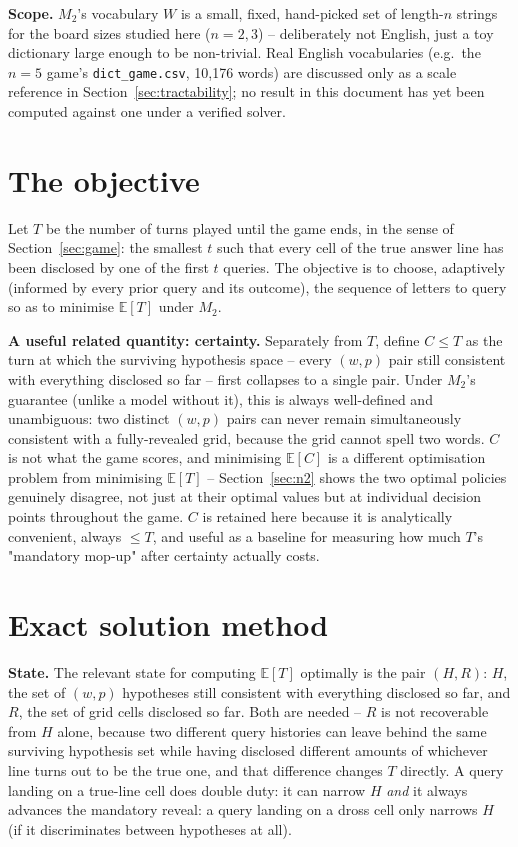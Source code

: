 \documentclass[11pt]{article}
\begin{document}
\textbf{Scope.} $M_2$'s vocabulary $W$ is a small, fixed, hand-picked set
of length-$n$ strings for the board sizes studied here ($n=2,3$) --
deliberately not English, just a toy dictionary large enough to be
non-trivial. Real English vocabularies (e.g.\ the $n=5$ game's
\texttt{dict\_game.csv}, 10,176 words)
are discussed only as a scale reference in Section~\ref{sec:tractability};
no result in this document has yet been computed against one under a
verified solver.

\section{The objective}
\label{sec:objective}

Let $T$ be the number of turns played until the game ends, in the sense
of Section~\ref{sec:game}: the smallest $t$ such that every cell of the
true answer line has been disclosed by one of the first $t$ queries. The
objective is to choose, adaptively (informed by every prior query and its
outcome), the sequence of letters to query so as to minimise
$\mathbb{E}[T]$ under $M_2$.

\textbf{A useful related quantity: certainty.} Separately from $T$,
define $C \le T$ as the turn at which the surviving hypothesis space --
every $(w,p)$ pair still consistent with everything disclosed so far --
first collapses to a single pair. Under $M_2$'s guarantee (unlike a model
without it), this is always well-defined and unambiguous: two distinct
$(w,p)$ pairs can never remain simultaneously consistent with a
fully-revealed grid, because the grid cannot spell two words. $C$ is not
what the game scores, and minimising $\mathbb{E}[C]$ is a different
optimisation problem from minimising $\mathbb{E}[T]$ -- Section~\ref{sec:n2}
shows the two optimal policies genuinely disagree, not just at their
optimal values but at individual decision points throughout the game. $C$
is retained here because it is analytically convenient, always $\le T$,
and useful as a baseline for measuring how much $T$'s "mandatory mop-up"
after certainty actually costs.

\section{Exact solution method}
\label{sec:method}

\textbf{State.} The relevant state for computing $\mathbb{E}[T]$ optimally
is the pair $(H, R)$: $H$, the set of $(w,p)$ hypotheses still consistent
with everything disclosed so far, and $R$, the set of grid cells disclosed
so far. Both are needed -- $R$ is not recoverable from $H$ alone, because
two different query histories can leave behind the same surviving
hypothesis set while having disclosed different amounts of whichever line
turns out to be the true one, and that difference changes $T$ directly. A
query landing on a true-line cell does double duty: it can narrow $H$
\emph{and} it always advances the mandatory reveal: a query landing on a
dross cell only narrows $H$ (if it discriminates between hypotheses at
all).
\end{document}
